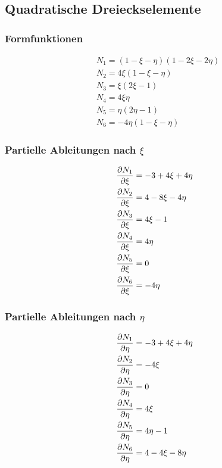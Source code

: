 \subsection{Quadratische Dreieckselemente}
\label{sec:quadratic_triangles_annex}
\begin{minipage}[t]{0.3\textwidth}
\subsubsection{Formfunktionen}
\begin{align*}
&N_1 = (1 - \xi - \eta)(1 - 2\xi - 2\eta)\\
&N_2 = 4\xi (1 - \xi - \eta) \\
&N_3 = \xi (2 \xi - 1)\\
&N_4 = 4 \xi \eta \\
&N_5 = \eta (2\eta - 1)\\
&N_6 = -4\eta (1 - \xi - \eta)
\end{align*}
\end{minipage}
\begin{minipage}[t]{0.3\textwidth}
\subsubsection{Partielle Ableitungen nach $\xi$}
\begin{align*}
&\frac{\partial N_1}{\partial \xi} = -3 + 4\xi + 4\eta\\
&\frac{\partial N_2}{\partial \xi} = 4 - 8\xi - 4\eta\\
&\frac{\partial N_3}{\partial \xi} = 4\xi - 1\\
&\frac{\partial N_4}{\partial \xi} = 4\eta\\
&\frac{\partial N_5}{\partial \xi} = 0\\
&\frac{\partial N_6}{\partial \xi} = -4\eta\\
\end{align*}
\end{minipage}
\begin{minipage}[t]{0.3\textwidth}
\subsubsection{Partielle Ableitungen nach $\eta$}
\begin{align*}
&\frac{\partial N_1}{\partial \eta} = -3 + 4\xi + 4\eta\\
&\frac{\partial N_2}{\partial \eta} = -4\xi \\
&\frac{\partial N_3}{\partial \eta} = 0\\
&\frac{\partial N_4}{\partial \eta} = 4\xi\\
&\frac{\partial N_5}{\partial \eta} = 4\eta - 1\\
&\frac{\partial N_6}{\partial \eta} = 4 - 4\xi - 8\eta\\
\end{align*}
\end{minipage}

